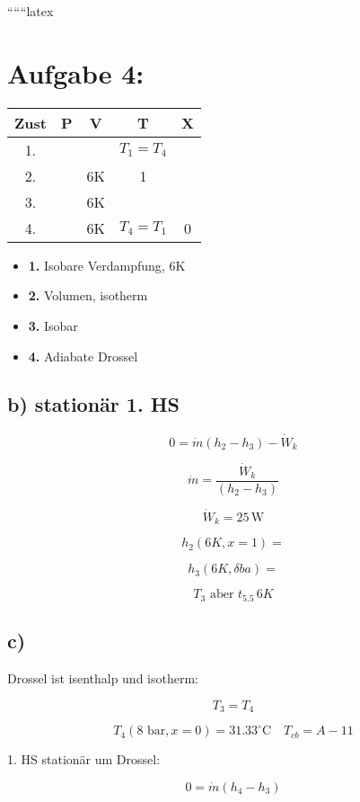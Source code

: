 
``````latex


\section*{Aufgabe 4:}

\begin{tabular}{|c|c|c|c|c|}
\hline
\textbf{Zust} & \textbf{P} & \textbf{V} & \textbf{T} & \textbf{X} \\
\hline
1. & & & $T_1 = T_4$ & \\
\hline
2. & & 6K & 1 & \\
\hline
3. & & 6K & & \\
\hline
4. & & 6K & $T_4 = T_1$ & 0 \\
\hline
\end{tabular}

\begin{itemize}
    \item \textbf{1.} Isobare Verdampfung, 6K
    \item \textbf{2.} Volumen, isotherm
    \item \textbf{3.} Isobar
    \item \textbf{4.} Adiabate Drossel
\end{itemize}

\subsection*{b) stationär 1. HS}

\[
0 = \dot{m} (h_2 - h_3) - \dot{W}_k
\]

\[
\dot{m} = \frac{\dot{W}_k}{(h_2 - h_3)}
\]

\[
\dot{W}_k = 25 \, \text{W}
\]

\[
h_2 (6K, x = 1) =
\]

\[
h_3 (6K, \delta ba) =
\]

\[
T_3 \text{ aber } t_5.5 \, 6K
\]

\subsection*{c)}

Drossel ist isenthalp und isotherm:

\[
T_3 = T_4
\]

\[
T_4 (8 \text{ bar}, x = 0) = 31.33^\circ \text{C} \quad T_{cb} = A - 11
\]

1. HS stationär um Drossel:

\[
0 = \dot{m} (h_4 - h_3)
\]

